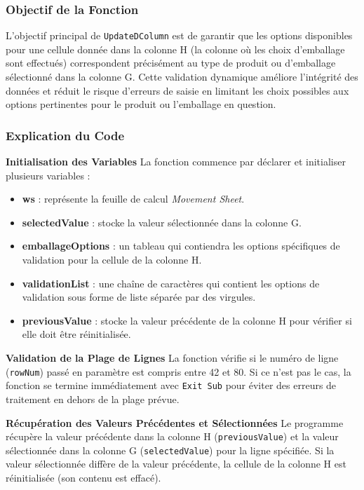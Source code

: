 \documentclass[a4paper, oneside, 12pt, final]{extreport}
\begin{document}
\subsubsection{Objectif de la Fonction}
L'objectif principal de \texttt{UpdateDColumn} est de garantir que les options disponibles pour une cellule donnée dans la colonne H (la colonne où les choix d'emballage sont effectués) correspondent précisément au type de produit ou d'emballage sélectionné dans la colonne G. Cette validation dynamique améliore l'intégrité des données et réduit le risque d'erreurs de saisie en limitant les choix possibles aux options pertinentes pour le produit ou l'emballage en question.

\subsubsection{Explication du Code}
\textbf{Initialisation des Variables}
La fonction commence par déclarer et initialiser plusieurs variables :

\begin{itemize}
    \item \textbf{ws} : représente la feuille de calcul \textit{Movement Sheet}.
    \item \textbf{selectedValue} : stocke la valeur sélectionnée dans la colonne G.
    \item \textbf{emballageOptions} : un tableau qui contiendra les options spécifiques de validation pour la cellule de la colonne H.
    \item \textbf{validationList} : une chaîne de caractères qui contient les options de validation sous forme de liste séparée par des virgules.
    \item \textbf{previousValue} : stocke la valeur précédente de la colonne H pour vérifier si elle doit être réinitialisée.
\end{itemize}

\textbf{Validation de la Plage de Lignes}
La fonction vérifie si le numéro de ligne (\texttt{rowNum}) passé en paramètre est compris entre 42 et 80. Si ce n'est pas le cas, la fonction se termine immédiatement avec \texttt{Exit Sub} pour éviter des erreurs de traitement en dehors de la plage prévue.

\textbf{Récupération des Valeurs Précédentes et Sélectionnées}
Le programme récupère la valeur précédente dans la colonne H (\texttt{previousValue}) et la valeur sélectionnée dans la colonne G (\texttt{selectedValue}) pour la ligne spécifiée. Si la valeur sélectionnée diffère de la valeur précédente, la cellule de la colonne H est réinitialisée (son contenu est effacé).
\end{document}

